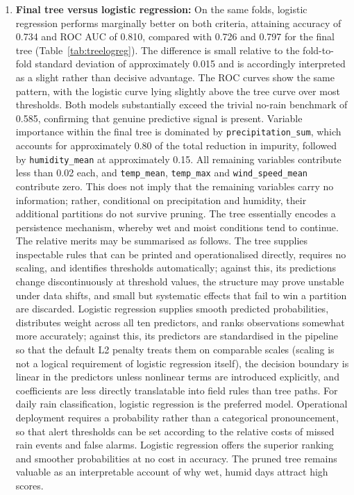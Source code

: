 \documentclass[conference]{IEEEtran}
\begin{document}
\begin{enumerate}
    \item \textbf{Final tree versus logistic regression:} On the same folds, logistic regression performs marginally better on both criteria, attaining accuracy of 0.734 and ROC AUC of 0.810, compared with 0.726 and 0.797 for the final tree (Table~\ref{tab:treelogreg}). The difference is small relative to the fold-to-fold standard deviation of approximately 0.015 and is accordingly interpreted as a slight rather than decisive advantage. The ROC curves show the same pattern, with the logistic curve lying slightly above the tree curve over most thresholds. Both models substantially exceed the trivial no-rain benchmark of 0.585, confirming that genuine predictive signal is present. Variable importance within the final tree is dominated by \texttt{precipitation\_sum}, which accounts for approximately 0.80 of the total reduction in impurity, followed by \texttt{humidity\_mean} at approximately 0.15. All remaining variables contribute less than 0.02 each, and \texttt{temp\_mean}, \texttt{temp\_max} and \texttt{wind\_speed\_mean} contribute zero. This does not imply that the remaining variables carry no information; rather, conditional on precipitation and humidity, their additional partitions do not survive pruning. The tree essentially encodes a persistence mechanism, whereby wet and moist conditions tend to continue. The relative merits may be summarised as follows. The tree supplies inspectable rules that can be printed and operationalised directly, requires no scaling, and identifies thresholds automatically; against this, its predictions change discontinuously at threshold values, the structure may prove unstable under data shifts, and small but systematic effects that fail to win a partition are discarded. Logistic regression supplies smooth predicted probabilities, distributes weight across all ten predictors, and ranks observations somewhat more accurately; against this, its predictors are standardised in the pipeline so that the default L2 penalty treats them on comparable scales (scaling is not a logical requirement of logistic regression itself), the decision boundary is linear in the predictors unless nonlinear terms are introduced explicitly, and coefficients are less directly translatable into field rules than tree paths. For daily rain classification, logistic regression is the preferred model. Operational deployment requires a probability rather than a categorical pronouncement, so that alert thresholds can be set according to the relative costs of missed rain events and false alarms. Logistic regression offers the superior ranking and smoother probabilities at no cost in accuracy. The pruned tree remains valuable as an interpretable account of why wet, humid days attract high scores.


\end{enumerate}
\end{document}

